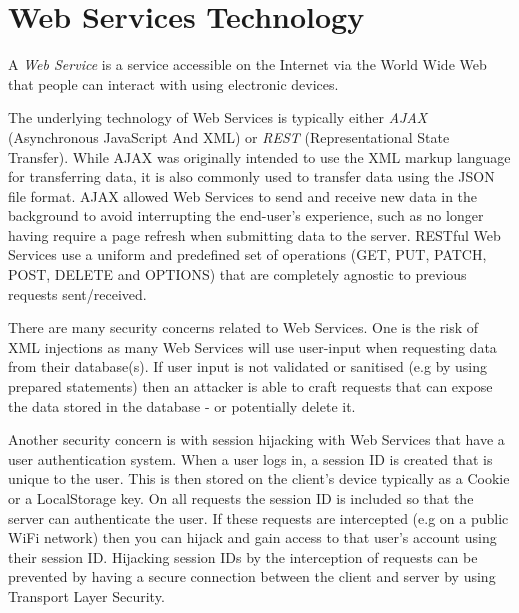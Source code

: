 \chapter{Web Services Technology}


A \textit{Web Service} is a service accessible on the Internet via the World Wide Web that people can interact with using electronic devices.


The underlying technology of Web Services is typically either \textit{AJAX} (Asynchronous JavaScript And XML) or \textit{REST} (Representational State Transfer). While AJAX was originally intended to use the XML markup language for transferring data, it is also commonly used to transfer data using the JSON file format. AJAX allowed Web Services to send and receive new data in the background to avoid interrupting the end-user's experience, such as no longer having require a page refresh when submitting data to the server. RESTful Web Services use a uniform and predefined set of operations (GET, PUT, PATCH, POST, DELETE and OPTIONS) that are completely agnostic to previous requests sent/received.

There are many security concerns related to Web Services. One is the risk of XML injections as many Web Services will use user-input when requesting data from their database(s). If user input is not validated or sanitised (e.g by using prepared statements) then an attacker is able to craft requests that can expose the data stored in the database - or potentially delete it.

Another security concern is with session hijacking with Web Services that have a user authentication system. When a user logs in, a session ID is created that is unique to the user. This is then stored on the client's device typically as a Cookie or a LocalStorage key. On all requests the session ID is included so that the server can authenticate the user. If these requests are intercepted (e.g on a public WiFi network) then you can hijack and gain access to that user's account using their session ID. Hijacking session IDs by the interception of requests can be prevented by having a secure connection between the client and server by using Transport Layer Security.

